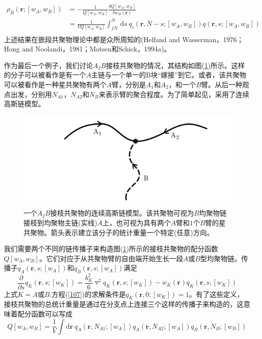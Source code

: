 \begin{equation}
\begin{aligned}
\rho _B(\mathbf{r};[w_A,w_B]) & =-\frac{1}{Q[w_A,w_B]}	\frac{\delta Q[w_A,w_B]}{\delta w_B(\mathbf{r})} \\
& =\frac{1}{VQ[w_A,w_B]} \int _{fN}^{N}\,\mathrm{d}s~q_c(\mathbf{r},N-s;[w_A,w_B])q(\mathbf{r},s;[w_A,w_B]) \\
\end{aligned}	
\end{equation}
上述结果在嵌段共聚物理论中都是众所周知的(Helfand and Wasserman，1976；Hong and Noolandi，1981；Matsen和Schick，1994a)。

作为最后一个例子，我们讨论$A_2B$接枝共聚物的情况，其结构如图(\ref{3.8})所示。这样的分子可以被看作是有一个$A$主链与一个单一的B块“嫁接”到它。或者，该共聚物可以被看作是一种星共聚物有两个$A$臂，分别是$A_1$和$A_2$，和一个$B$臂。从后一种观点出发，分别用$N_{A1}$，$N_{A2}$和$N_B$来表示臂的聚合程度。为了简单起见，采用了连续高斯链模型。

\begin{figure}[H]
\centering
\includegraphics[scale=0.7]{./figures/38.png}
\caption{一个$A_2B$接枝共聚物的连续高斯链模型。该共聚物可视为$B$均聚物链接枝到均聚物主链(实线)$A$上，也可视为具有两个$A$臂和$1$个$B$臂的星共聚物。箭头表示建立该分子的统计重量一个特定(任意)方向。}
\label{3.8}
\end{figure}		

我们需要两个不同的链传播子来构造图(\ref{3.8})所示的接枝共聚物的配分函数$Q[w_A,w_B]$。它们对应于从共聚物臂的自由端开始生长一段$A$或$B$型均聚物链。传播子$q_A(\mathbf{r},s;[w_A])$和$q_B(\mathbf{r},s;[w_A])$满足
\begin{equation}
\frac{\partial}{\partial s}q_K(\mathbf{r},s;[w_K])=\frac{b_K^2}{6}\triangledown ^2q_K(\mathbf{r},s;[w_K])-w_K(\mathbf{r})q_K(\mathbf{r},s;[w_K]) \label{107}
\end{equation}
上式$K=A$或$B$.方程(\ref{107})的求解条件是$q_K(\mathbf{r},0;[w_K])=1$。有了这些定义，接枝共聚物的总统计重量是通过在分支点上连接三个这样的传播子来构造的，这意味着配分函数可以写成
\begin{equation}
Q[w_A,w_B]=\frac{1}{V}\int \mathrm{d}\mathbf{r}~q_A(\mathbf{r},N_{A1};[w_A])q_A(\mathbf{r},N_{A2};[w_A])q_B(\mathbf{r},N_B;[w_B])
\end{equation}

